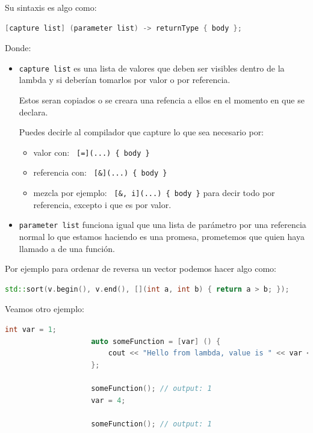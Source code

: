 \documentclass[12pt, fleqn]{report}                             %
\theoremstyle{break}                                            %
\newcommand{\textCode}[1]  { \texttt{#1} }                      %
\begin{document}
                Su sintaxis es algo como:
                \begin{lstlisting}[language=C++, gobble=20]
                    [capture list] (parameter list) -> returnType { body };
                \end{lstlisting} 

                Donde:
                \begin{itemize}
                    \item \textCode{capture list} es una lista de valores que deben ser visibles dentro
                        de la lambda y si deberían tomarlos por valor o por referencia.

                        Estos seran copiados o se creara una refencia a ellos en el momento en que se
                        declara.

                        Puedes decirle al compilador que capture lo que sea necesario por:
                        \begin{itemize}
                            \item valor con: \textCode{ [=](...) \{ body \}}
                            \item referencia con: \textCode{ [\&](...) \{ body \}}
                            \item mezcla  por ejemplo: \textCode{ [\&, i](...) \{ body \}} 
                            \; para decir todo por referencia, excepto i que es por valor. 
                        \end{itemize}

                        
                    \item \textCode{parameter list} funciona igual que una lista de parámetro por una referencia normal
                    lo que estamos haciendo es una promesa, prometemos que quien haya llamado a  
                        de una función.
                \end{itemize}

                Por ejemplo para ordenar de reversa un vector podemos hacer algo como:
                \begin{lstlisting}[language=C++, gobble=20]
                    std::sort(v.begin(), v.end(), [](int a, int b) { return a > b; });
                \end{lstlisting}
                
                Veamos otro ejemplo:
                \begin{lstlisting}[language=C++, gobble=20]
                    int var = 1;
                    auto someFunction = [var] () { 
                        cout << "Hello from lambda, value is " << var << '\n';
                    };

                    someFunction(); // output: 1
                    var = 4;

                    someFunction(); // output: 1
                \end{lstlisting}
\end{document}
